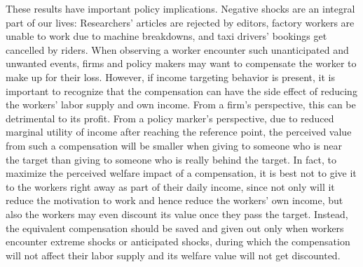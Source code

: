\documentclass[reviewmode,AEJ]{AEA}
\begin{document}
These results have important policy implications. Negative shocks are an integral part of our lives: Researchers' articles are rejected by editors, factory workers are unable to work due to machine breakdowns, and taxi drivers' bookings get cancelled by riders. When observing a worker encounter such unanticipated and unwanted events,  firms and policy makers may want to compensate the worker to make up for their loss. However, if income targeting behavior is present, it is important to recognize that the compensation can have the side effect of reducing the workers' labor supply and own income. From a firm's perspective, this can be detrimental to its profit. From a policy marker's perspective, due to reduced marginal utility of income after reaching the reference point, the perceived value from such a compensation will be smaller when giving to someone who is near the target than giving to someone who is really behind the target. In fact, to maximize the perceived welfare impact of a compensation, it is best not to give it to the workers right away as part of their daily income, since not only will it reduce the motivation to work and hence reduce the workers' own income, but also the workers may even discount its value once they pass the target. Instead, the equivalent compensation should be saved and given out only when workers encounter extreme shocks or anticipated shocks, during which the compensation will not affect their labor supply and its welfare value will not get discounted.

\end{document}
